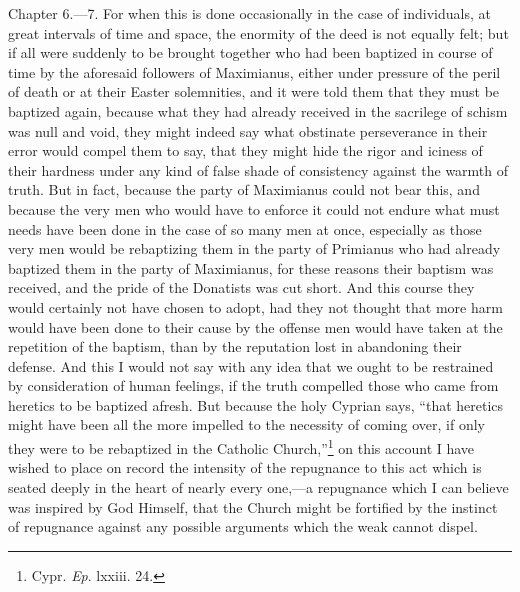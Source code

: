 
Chapter 6.—7. For when this is done occasionally in the case of individuals, at great intervals of time and space, the enormity of the deed is not equally felt; but if all were suddenly to be brought together who had been baptized in course of time by the aforesaid followers of Maximianus, either under pressure of the peril of death or at their Easter solemnities, and it were told them that they must be baptized again, because what they had already received in the sacrilege of schism was null and void, they might indeed say what obstinate perseverance in their error would compel them to say, that they might hide the rigor and iciness of their hardness under any kind of false shade of consistency against the warmth of truth. But in fact, because the party of Maximianus could not bear this, and because the very men who would have to enforce it could not endure what must needs have been done in the case of so many men at once, especially as those very men would be rebaptizing them in the party of Primianus who had already baptized them in the party of Maximianus, for these reasons their baptism was received, and the pride of the Donatists was cut short. And this course they would certainly not have chosen to adopt, had they not thought that more harm would have been done to their cause by the offense men would have taken at the repetition of the baptism, than by the reputation lost in abandoning their defense. And this I would not say with any idea that we ought to be restrained by consideration of human feelings, if the truth compelled those who came from heretics to be baptized afresh. But because the holy Cyprian says, ``that heretics might have been all the more impelled to the necessity of coming over, if only they were to be rebaptized in the Catholic Church,''\footnote{\par  Cypr. \emph{Ep}. lxxiii. 24.} on this account I have wished to place on record the intensity of the repugnance to this act which is seated deeply in the heart of nearly every one,—a repugnance which I can believe was inspired by God Himself, that the Church might be fortified by the instinct of repugnance against any possible arguments which the weak cannot dispel.


